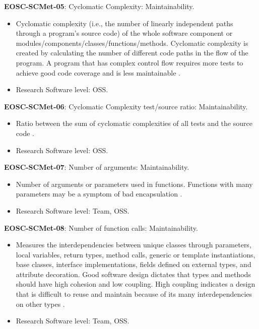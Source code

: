 \textbf{EOSC-SCMet-05}: Cyclomatic Complexity: Maintainability.

\begin{itemize}
    \item Cyclomatic complexity (i.e.,  the number of linearly independent paths through a program's source code) of the whole software component or modules/components/classes/functions/methods. Cyclomatic complexity is created by calculating the number of different code paths in the flow of the program. A program that has complex control flow requires more tests to achieve good code coverage and is less maintainable \cite{srisopha_software_2018,montagud_systematic_2012,baggen_standardized_2012,nagappan_early_2005}.
    \item Research Software level: OSS.
\end{itemize}

\textbf{EOSC-SCMet-06}: Cyclomatic Complexity test/source ratio: Maintainability.

\begin{itemize}
    \item Ratio between the sum of cyclomatic complexities of all tests and the source code \cite{nagappan_early_2005}.
    \item Research Software level: OSS.
\end{itemize}

\textbf{EOSC-SCMet-07}: Number of arguments: Maintainability.

\begin{itemize}
    \item Number of arguments or parameters used in functions. Functions with many parameters may be a symptom of bad encapsulation \cite{baggen_standardized_2012,ogasawara_experiences_1996}.
    \item Research Software level: Team, OSS.
\end{itemize}

\textbf{EOSC-SCMet-08}: Number of function calls: Maintainability.

\begin{itemize}
    \item Measures the interdependencies between unique classes through parameters, local variables, return types, method calls, generic or template instantiations, base classes, interface implementations, fields defined on external types, and attribute decoration. Good software design dictates that types and methods should have high cohesion and low coupling. High coupling indicates a design that is difficult to reuse and maintain because of its many interdependencies on other types \cite{montagud_systematic_2012,ogasawara_experiences_1996}.
    \item Research Software level: Team, OSS.
\end{itemize}

